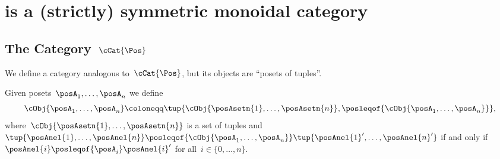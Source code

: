 
\section[\DP is (strictly) symmetric monoidal]{\DP is a (strictly) symmetric monoidal category}
\label{sec:parallelism-DP-monoidal}

\subsection{The Category~$\cCat{\Pos}$}

We define a category analogous to~$\cCat{\Pos}$, but its objects are ``posets of tuples''.

Given posets~$\posA_1,\ldots, \posA_n$ we define
\begin{equation*}
    \cObj{\posA_1,\ldots, \posA_n}\coloneqq \tup{\cObj{\posAsetn{1},\ldots, \posAsetn{n}}, \posleqof{\cObj{\posA_1,\ldots, \posA_n}}},
\end{equation*}
where~$\cObj{\posAsetn{1},\ldots, \posAsetn{n}}$ is a set of tuples and~$\tup{\posAnel{1},\ldots, \posAnel{n}}\posleqof{\cObj{\posA_1,\ldots, \posA_n}}\tup{\posAnel{1}',\ldots, \posAnel{n}'}$ if and only if~$\posAnel{i}\posleqof{\posA_i} \posAnel{i}'$ for all~$i\in \{0,\ldots, n\}$.
%

